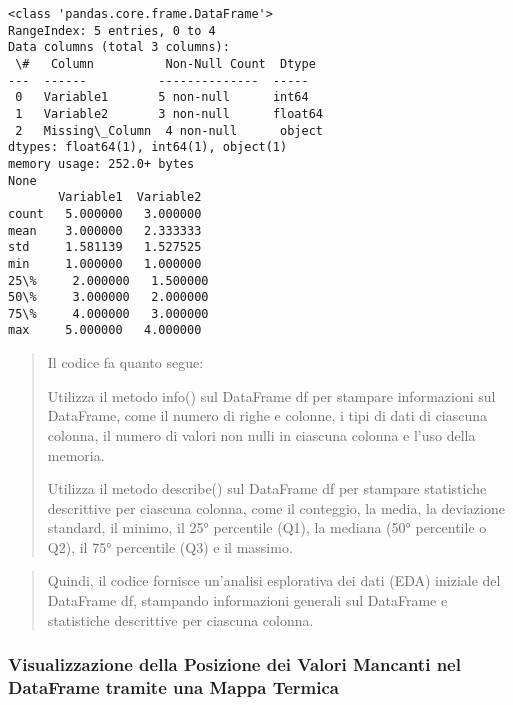 \documentclass[11pt]{article}
\begin{document}
    \begin{Verbatim}[commandchars=\\\{\}]
<class 'pandas.core.frame.DataFrame'>
RangeIndex: 5 entries, 0 to 4
Data columns (total 3 columns):
 \#   Column          Non-Null Count  Dtype
---  ------          --------------  -----
 0   Variable1       5 non-null      int64
 1   Variable2       3 non-null      float64
 2   Missing\_Column  4 non-null      object
dtypes: float64(1), int64(1), object(1)
memory usage: 252.0+ bytes
None
       Variable1  Variable2
count   5.000000   3.000000
mean    3.000000   2.333333
std     1.581139   1.527525
min     1.000000   1.000000
25\%     2.000000   1.500000
50\%     3.000000   2.000000
75\%     4.000000   3.000000
max     5.000000   4.000000
    \end{Verbatim}

    \begin{quote}
Il codice fa quanto segue:

Utilizza il metodo info() sul DataFrame df per stampare informazioni sul
DataFrame, come il numero di righe e colonne, i tipi di dati di ciascuna
colonna, il numero di valori non nulli in ciascuna colonna e l'uso della
memoria.

Utilizza il metodo describe() sul DataFrame df per stampare statistiche
descrittive per ciascuna colonna, come il conteggio, la media, la
deviazione standard, il minimo, il 25° percentile (Q1), la mediana (50°
percentile o Q2), il 75° percentile (Q3) e il massimo.
\end{quote}

\begin{quote}
Quindi, il codice fornisce un'analisi esplorativa dei dati (EDA)
iniziale del DataFrame df, stampando informazioni generali sul DataFrame
e statistiche descrittive per ciascuna colonna.
\end{quote}

    \subsubsection{Visualizzazione della Posizione dei Valori Mancanti nel
DataFrame tramite una Mappa
Termica}\label{visualizzazione-della-posizione-dei-valori-mancanti-nel-dataframe-tramite-una-mappa-termica}
\end{document}
